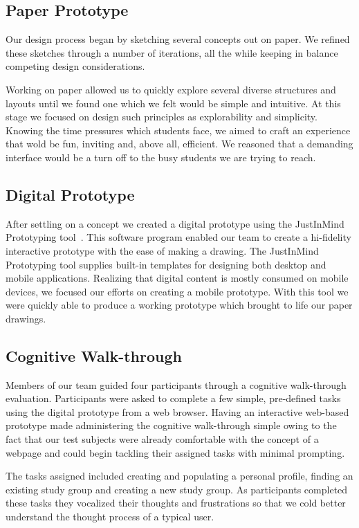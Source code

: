 \documentclass{sigchi-ext}
\begin{document}
\subsection{Paper Prototype}

Our design process began by sketching several concepts out on paper. We refined
these sketches through a number of iterations, all the while keeping in balance
competing design considerations.

Working on paper allowed us to quickly explore several diverse structures and
layouts until we found one which we felt would be simple and intuitive. At this
stage we focused on design such principles as explorability and simplicity.
Knowing the time pressures which students face, we aimed to craft an experience
that wold be fun, inviting and, above all, efficient. We reasoned that a
demanding interface would be a turn off to the busy students we are trying to
reach.


\subsection{Digital Prototype}

After settling on a concept we created a digital prototype using the JustInMind Prototyping
tool~\cite{justinmind}. This software program enabled our team to create a hi-fidelity interactive
prototype with the ease of making a drawing. The JustInMind Prototyping tool supplies built-in
templates for designing both desktop and mobile applications. Realizing that digital content is
mostly consumed on mobile devices, we focused our efforts on creating a mobile prototype. With this
tool we were quickly able to produce a working prototype which brought to life our paper drawings.


\subsection{Cognitive Walk-through}

Members of our team guided four participants through a cognitive walk-through
evaluation. Participants were asked to complete a few simple, pre-defined tasks
using the digital prototype from a web browser. Having an interactive
web-based prototype made administering the cognitive walk-through simple owing
to the fact that our test subjects were already comfortable with the concept of
a webpage and could begin tackling their assigned tasks with minimal prompting.

The tasks assigned included creating and populating a personal profile, finding an existing study
group and creating a new study group. As participants completed these tasks they vocalized their
thoughts and frustrations so that we cold better understand the thought process of a typical user.
\end{document}

